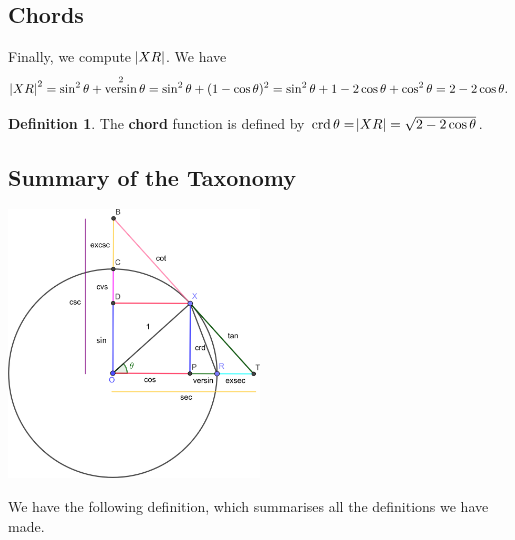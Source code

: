 \documentclass[a4paper,leqno]{article}
\numberwithin{equation}{section}
\theoremstyle{definition}
\newtheorem{defn}[equation]{Definition}
\theoremstyle{remark}
\newcommand{\df}[1]{\textbf{#1}}
\DeclareMathOperator{\versin}{versin}
\DeclareMathOperator{\crd}{crd}
\begin{document}
\subsection{Chords}
Finally, we compute $ \abs{XR} $. We have
\begin{displaymath}
  \abs{XR}^2 = \sin^2 \theta + \versin^2 \theta = \sin^2 \theta + (1 - \cos \theta)^2 = \sin^2 \theta + 1 - 2\cos \theta + \cos^2 \theta = 2 - 2\cos \theta.
\end{displaymath}

\begin{defn}\label{defn:chord}
  The \df{chord} function is defined by $ \crd \theta = \abs{XR} = \sqrt{2 - 2\cos \theta} $.
\end{defn}

\subsection{Summary of the Taxonomy}
\begin{center}
  \includegraphics[width=0.5\textwidth]{taxonomyall}
\end{center}
We have the following definition, which summarises all the definitions we have made.
\end{document}
